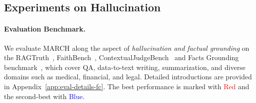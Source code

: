 \documentclass[10pt, a4paper, logo]{googledeepmind} %
\def\rr{\textcolor{red}}
\def\bb{\textcolor{blue}}
\begin{document}


\subsection{Experiments on Hallucination}
\paragraph{Evaluation Benchmark.}
We evaluate MARCH along the aspect of \emph{hallucination and factual grounding} on the RAGTruth~\citep{niu2024ragtruth}, FaithBench~\citep{tamber2025benchmarking}, ContextualJudgeBench~\citep{xu2025does} and Facts Grounding benchmark~\citep{jacovi2025facts}, which cover QA, data-to-text writing, summarization, and diverse domains such as medical, financial, and legal. Detailed introductions are provided in Appendix~\ref{app:eval-details-fc}. The best performance is marked with \rr{Red} and the second-best with \bb{Blue}.
\end{document}
